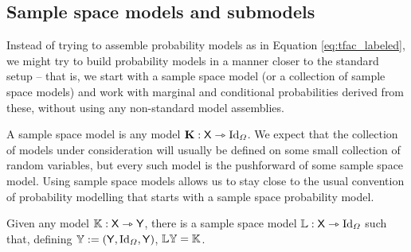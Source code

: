 \subsection{Sample space models and submodels}

Instead of trying to assemble probability models as in Equation \ref{eq:tfac_labeled}, we might try to build probability models in a manner closer to the standard setup -- that is, we start with a sample space model (or a collection of sample space models) and work with marginal and conditional probabilities derived from these, without using any non-standard model assemblies.

A sample space model is any model $\mathbf{K}:\mathsf{X}\rightarrowtriangle \text{Id}_\Omega$. We expect that the collection of models under consideration will usually be defined on some small collection of random variables, but every such model is the pushforward of some sample space model. Using sample space models allows us to stay close to the usual convention of probability modelling that starts with a sample space probability model.

\begin{lemma}\label{lem:ss_exist}
Given any model $\mathbb{K}:\mathsf{X}\rightarrowtriangle \mathsf{Y}$, there is a sample space model $\mathbb{L}:\mathsf{X}\rightarrowtriangle\text{Id}_\Omega$ such that, defining $\mathbb{Y}:=(\mathsf{Y},\text{Id}_\Omega,\mathsf{Y})$, $\mathbb{L}\mathbb{Y}=\mathbb{K}$.
\end{lemma}


